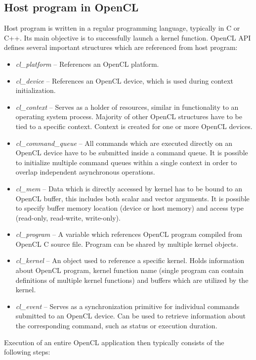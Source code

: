 \documentclass
[
    digital, %
    oneside, %
    table, %
    nolof, %
    nolot, %
    nocover %
]{fithesis3}
\begin{document}
\subsection{Host program in OpenCL}
Host program is written in a regular programming language, typically in C or C++. Its main objective is to successfully launch a kernel function.
OpenCL API defines several important structures which are referenced from host program:
\begin{itemize}
    \item \textit{cl\_platform} -- References an OpenCL platform.
    \item \textit{cl\_device} -- References an OpenCL device, which is used during context initialization.
    \item \textit{cl\_context} -- Serves as a holder of resources, similar in functionality to an operating system process. Majority of other OpenCL
    structures have to be tied to a specific context. Context is created for one or more OpenCL devices.
    \item \textit{cl\_command\_queue} -- All commands which are executed directly on an OpenCL device have to be submitted inside a command queue. It
    is possible to initialize multiple command queues within a single context in order to overlap independent asynchronous operations.
    \item \textit{cl\_mem} -- Data which is directly accessed by kernel has to be bound to an OpenCL buffer, this includes both scalar and vector
    arguments. It is possible to specify buffer memory location (device or host memory) and access type (read-only, read-write, write-only).
    \item \textit{cl\_program} -- A variable which references OpenCL program compiled from OpenCL C source file. Program can be shared by multiple
    kernel objects.
    \item \textit{cl\_kernel} -- An object used to reference a specific kernel. Holds information about OpenCL program, kernel function name (single
    program can contain definitions of multiple kernel functions) and buffers which are utilized by the kernel.
    \item \textit{cl\_event} -- Serves as a synchronization primitive for individual commands submitted to an OpenCL device. Can be used to retrieve
    information about the corresponding command, such as status or execution duration.
\end{itemize}
Execution of an entire OpenCL application then typically consists of the following steps:
\end{document}
